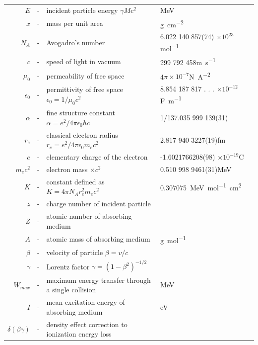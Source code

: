 	\begin{longtable}{r c l l}
		$E$ &-& incident particle energy $\gamma Mc^2$ & \si{MeV}\\
		$x$ &-& mass per unit area & \si{g.cm^{-2}}\\
		$N_A$ &-& Avogadro's number & 6.022 140 857(74) $\times 10^{23}$\si{mol^{-1}}\\
		$c$ &-& speed of light in vacuum & 299 792 458\si{m.s^{-1}}\\
		$\mu_0$ &-& permeability of free space & 4$\pi\times 10^{-7}$\si{N.A^{-2}}\\
		$\epsilon_0$ &-& permittivity of free space $\epsilon_0 = 1/\mu_0c^2$ & 8.854 187 817 . . . $\times 10^{-12}$\si{F.m^{-1}}\\
		$\alpha$ &-& fine structure constant $\alpha = e^2/4\pi\epsilon_0\hbar c$ & 1/137.035 999 139(31)\\
		$r_e$ &-& classical electron radius $r_e = e^2/4\pi\epsilon_0m_ec^2$ & 2.817 940 3227(19)\si{fm}\\
		$e$ &-& elementary charge of the electron & -1.6021766208(98) $\times 10^{-19}$\si{C}\\
		$m_ec^2$ &-& electron mass $\times c^2$ & 0.510 998 9461(31)\si{MeV}\\
		$K$ &-& constant defined as $K = 4\pi N_A r_e^2 m_ec^2$ & \SI{0.307075}{MeV.mol^{-1}.cm^2}\\
		$z$ &-& charge number of incident particle &\\
		$Z$ &-& atomic number of absorbing medium &\\
		$A$ &-& atomic mass of absorbing medium & \si{g.mol^{-1}}\\
		$\beta$ &-& velocity of particle $\beta = v/c$ &\\
		$\gamma$ &-& Lorentz factor $\gamma = (1-\beta^2)^{-1/2}$&\\
		$W_{max}$ &-& maximum energy transfer through a single collision & \si{MeV}\\
		$I$ &-& mean excitation energy of absorbing medium & \si{eV}\\
		$\delta(\beta\gamma)$ &-& density effect correction to ionization energy loss & \\
	\end{longtable}
	
